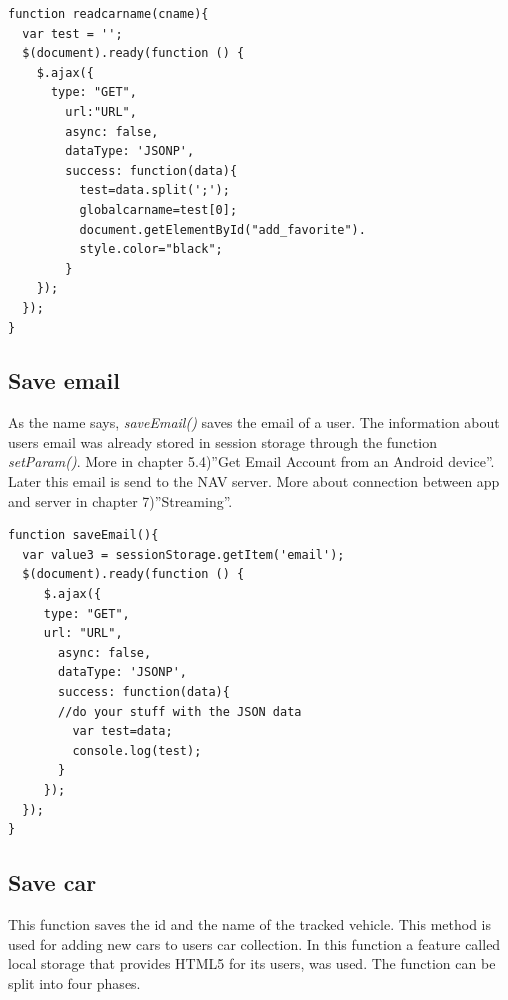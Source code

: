 
\begin{lstlisting}[language=html, caption= 
Read car name function,captionpos=b]
function readcarname(cname){
  var test = '';
  $(document).ready(function () {
    $.ajax({
      type: "GET",
        url:"URL",
        async: false,
        dataType: 'JSONP',
        success: function(data){
          test=data.split(';');
          globalcarname=test[0];
          document.getElementById("add_favorite").
          style.color="black";
        }
    });
  });
}
\end{lstlisting}

\subsection{Save email}
As the name says, \textit{saveEmail()} saves the email of a user. The information about users email was already stored in session storage through the function \textit{setParam()}. More in chapter 5.4)''Get Email Account from an Android device''.\\

Later this email is send to the NAV server. More about connection between app and server in chapter 7)''Streaming''.
\\

\begin{lstlisting}[language=html, caption= 
Save email function,captionpos=b]
function saveEmail(){    
  var value3 = sessionStorage.getItem('email');
  $(document).ready(function () {
     $.ajax({
     type: "GET",
     url: "URL",
       async: false,
       dataType: 'JSONP',
       success: function(data){
       //do your stuff with the JSON data
         var test=data;
         console.log(test);
       }
     });
  });
}
\end{lstlisting}

\subsection{Save car}
This function saves the id and the name of the tracked vehicle. This method is used for adding new cars to users car collection. In this function a feature called local storage that provides HTML5 for its users, was used. The function can be split into four phases.
\\

